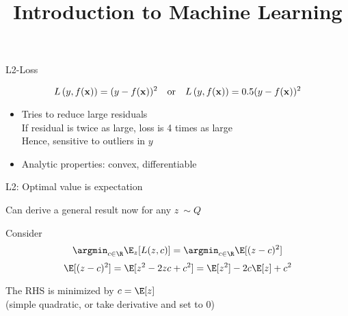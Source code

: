 \documentclass[11pt,compress,t,notes=noshow, xcolor=table]{beamer}
\title{Introduction to Machine Learning}
\begin{document}
    

\begin{frame}{L2-Loss}

$$
L\left(y, f(\mathbf{x})\right) = (y-f(\mathbf{x}))^2 \quad \text{or} \quad L\left(y, f(\mathbf{x})\right) = 0.5 (y-f(\mathbf{x}))^2
$$

\vfill

\begin{itemize}
\item Tries to reduce large residuals \\
If residual is twice as large, loss is 4 times as large\\
Hence, sensitive to outliers in $y$
\item Analytic properties: convex, differentiable 
\end{itemize}




\end{frame}


\begin{framei}[sep=L]{L2: Optimal value is expectation}

\item Can derive a general result now for any $z ~ \sim Q$
\item Consider 
$$ \argmin_{c \in \R}  \E_{z} [L(z, c)] = \argmin_{c \in \R}  \E [(z - c)^2] $$
$$\E [(z - c)^2] =  \E [z^2 - 2zc + c^2 ] = \E[z^2] -2c\E[z] + c^2   $$

\item The RHS is minimized by $c = \E[z]$\\
(simple quadratic, or take derivative and set to 0)

\end{framei}
\end{document}
